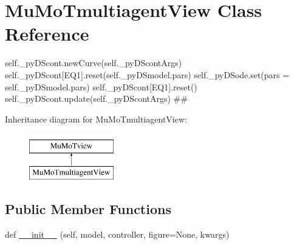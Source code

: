 \hypertarget{class_mu_mo_t_1_1_mu_mo_tmultiagent_view}{}\section{Mu\+Mo\+Tmultiagent\+View Class Reference}
\label{class_mu_mo_t_1_1_mu_mo_tmultiagent_view}


self.\+\_\+py\+D\+Scont.\+new\+Curve(self.\+\_\+py\+D\+Scont\+Args) self.\+\_\+py\+D\+Scont\mbox{[}\textquotesingle{}E\+Q1\textquotesingle{}\mbox{]}.reset(self.\+\_\+py\+D\+Smodel.\+pars) self.\+\_\+py\+D\+Sode.\+set(pars = self.\+\_\+py\+D\+Smodel.\+pars) self.\+\_\+py\+D\+Scont\mbox{[}\textquotesingle{}E\+Q1\textquotesingle{}\mbox{]}.reset() self.\+\_\+py\+D\+Scont.\+update(self.\+\_\+py\+D\+Scont\+Args) \#\#  


Inheritance diagram for Mu\+Mo\+Tmultiagent\+View\+:\begin{figure}[H]
\begin{center}
\leavevmode
\includegraphics[height=2.000000cm]{class_mu_mo_t_1_1_mu_mo_tmultiagent_view}
\end{center}
\end{figure}
\subsection*{Public Member Functions}
\begin{DoxyCompactItemize}
\item 
def \hyperlink{class_mu_mo_t_1_1_mu_mo_tmultiagent_view_a56403a3c4cf6f48d384a21f5ecb01918}{\+\_\+\+\_\+init\+\_\+\+\_\+} (self, model, controller, figure=None, kwargs)
\end{DoxyCompactItemize}
